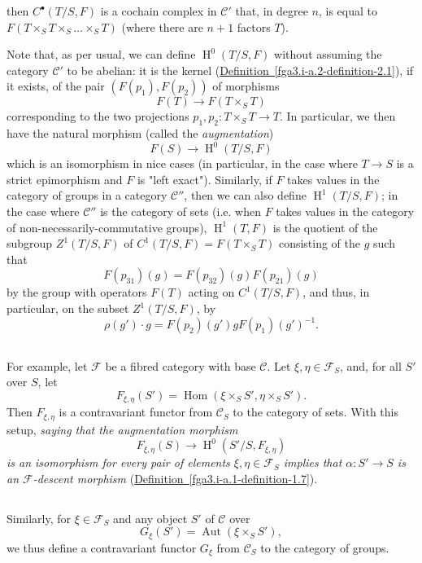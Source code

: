   then \(C^\bullet (T/S,F)\) is a cochain complex in \(\mathcal {C}'\) that, in degree \(n\), is equal to \(F(T\times _S T\times _S\ldots \times _S T)\) (where there are \(n+1\) factors \(T\)).\par{}Note that, as per usual, we can define \(\operatorname {H}^0(T/S,F)\) without assuming the category \(\mathcal {C}'\) to be abelian:
  it is the kernel (\hyperref[fga3.i-a.2-definition-2.1]{Definition~\ref*{fga3.i-a.2-definition-2.1}}), if it exists, of the pair \((F(p_1),F(p_2))\) of morphisms
  \[     F(T) \to  F(T\times _S T)   \]
  corresponding to the two projections \(p_1,p_2\colon  T\times _S T\to  T\).
  In particular, we then have the natural morphism (called the \emph{augmentation})
  \[     F(S) \to  \operatorname {H}^0(T/S,F)   \]
  which is an isomorphism in nice cases (in particular, in the case where \(T\to  S\) is a strict epimorphism and \(F\) is "left exact").
  Similarly, if \(F\) takes values in the category of groups in a category \(\mathcal {C}''\), then we can also define \(\operatorname {H}^1(T/S,F)\);
  in the case where \(\mathcal {C}''\) is the category of sets (i.e. when \(F\) takes values in the category of non-necessarily-commutative groups), \(\operatorname {H}^1(T,F)\) is the quotient of the subgroup \(Z^1(T/S,F)\) of \(C^1(T/S,F) = F(T\times _S T)\) consisting of the \(g\) such that
  \[     F(p_{31})(g)     = F(p_{32})(g) F(p_{21})(g)   \]
  by the group with operators \(F(T)\) acting on \(C^1(T/S,F)\), and thus, in particular, on the subset \(Z^1(T/S,F)\), by
  \[     \rho (g')\cdot  g     = F(p_2)(g') g F(p_1)(g')^{-1}.   \]\subsection{}\label{fga3.i-a.4.b}\par{}For example, let \(\mathcal {F}\) be a fibred category with base \(\mathcal {C}\).
  Let \(\xi ,\eta \in \mathcal {F}_S\), and, for all \(S'\) over \(S\), let
  \[     F_{\xi ,\eta }(S')     = \operatorname {Hom}(\xi \times _S S', \eta \times _S S').   \]
  Then \(F_{\xi ,\eta }\) is a contravariant functor from \(\mathcal {C}_S\) to the category of sets.
  With this setup, \emph{saying that the augmentation morphism}
  \[     F_{\xi ,\eta }(S) \to  \operatorname {H}^0(S'/S,F_{\xi ,\eta })   \]
  \emph{is an isomorphism for every pair of elements \(\xi ,\eta \in \mathcal {F}_S\) implies that \(\alpha \colon  S'\to  S\) is an \(\mathcal {F}\)-descent morphism} (\hyperref[fga3.i-a.1-definition-1.7]{Definition~\ref*{fga3.i-a.1-definition-1.7}}).\subsection{}\label{fga3.i-a.4.c}\par{}Similarly, for \(\xi \in \mathcal {F}_S\) and any object \(S'\) of \(\mathcal {C}\) over
  \[     G_\xi (S')     = \operatorname {Aut}(\xi \times _S S'),   \]
  we thus define a contravariant functor \(G_\xi \) from \(\mathcal {C}_S\) to the category of groups.
  
